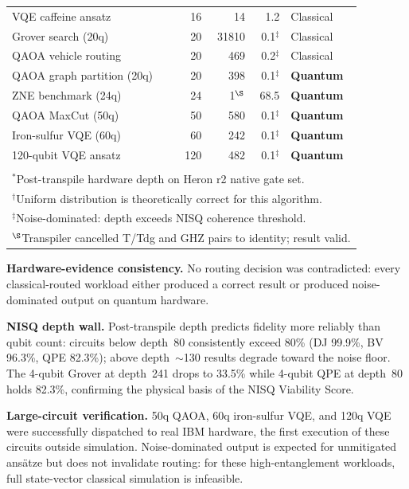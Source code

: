 \documentclass[10pt,conference]{IEEEtran}
\begin{document}
\begin{table}[htbp]
\begin{tabular}{l r r r l}
VQE caffeine ansatz          &  16 &    14 &  1.2 & Classical \\
Grover search (20q)          &  20 & 31810 &  0.1$^{\ddagger}$ & Classical \\
QAOA vehicle routing         &  20 &   469 &  0.2$^{\ddagger}$ & Classical \\
QAOA graph partition (20q)   &  20 &   398 &  0.1$^{\ddagger}$ & \textbf{Quantum} \\
ZNE benchmark (24q)          &  24 &     1$^{\S}$ & 68.5 & \textbf{Quantum} \\
QAOA MaxCut (50q)            &  50 &   580 &  0.1$^{\ddagger}$ & \textbf{Quantum} \\
Iron-sulfur VQE (60q)        &  60 &   242 &  0.1$^{\ddagger}$ & \textbf{Quantum} \\
120-qubit VQE ansatz         & 120 &   482 &  0.1$^{\ddagger}$ & \textbf{Quantum} \\
\bottomrule
\\[-0.5em]
\multicolumn{5}{l}{\footnotesize $^{*}$Post-transpile hardware depth on Heron r2 native gate set.} \\
\multicolumn{5}{l}{\footnotesize $^{\dagger}$Uniform distribution is theoretically correct for this algorithm.} \\
\multicolumn{5}{l}{\footnotesize $^{\ddagger}$Noise-dominated: depth exceeds NISQ coherence threshold.} \\
\multicolumn{5}{l}{\footnotesize $^{\S}$Transpiler cancelled T/Tdg and GHZ pairs to identity; result valid.} \\
\end{tabular}
\end{table}

\textbf{Hardware-evidence consistency.} No routing decision was contradicted: every classical-routed workload either produced a correct result or produced noise-dominated output on quantum hardware.

\textbf{NISQ depth wall.} Post-transpile depth predicts fidelity more reliably than qubit count: circuits below depth~80 consistently exceed 80\% (DJ 99.9\%, BV 96.3\%, QPE 82.3\%); above depth~$\sim$130 results degrade toward the noise floor. The 4-qubit Grover at depth~241 drops to 33.5\% while 4-qubit QPE at depth~80 holds 82.3\%, confirming the physical basis of the NISQ Viability Score.

\textbf{Large-circuit verification.} 50q QAOA, 60q iron-sulfur VQE, and 120q VQE were successfully dispatched to real IBM hardware, the first execution of these circuits outside simulation. Noise-dominated output is expected for unmitigated ansätze but does not invalidate routing: for these high-entanglement workloads, full state-vector classical simulation is infeasible.
\end{document}
